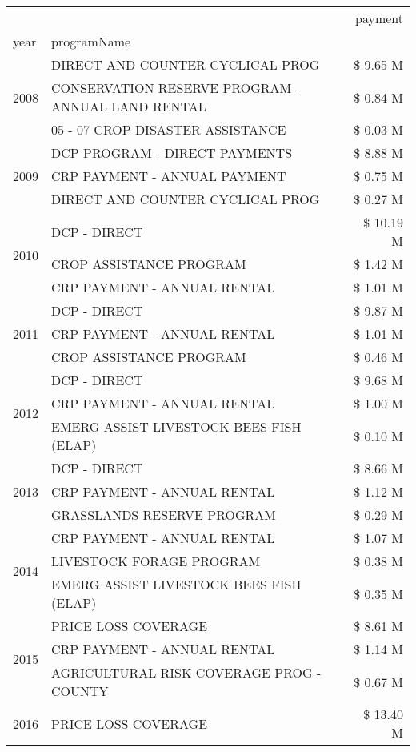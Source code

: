 \begin{tabular}{llr}
\toprule
 &  & payment \\
year & programName &  \\
\midrule
\multirow[t]{3}{*}{2008} & DIRECT AND COUNTER CYCLICAL PROG & \$ 9.65 M \\
 & CONSERVATION RESERVE PROGRAM - ANNUAL LAND RENTAL & \$ 0.84 M \\
 & 05 - 07 CROP DISASTER ASSISTANCE & \$ 0.03 M \\
\cline{1-3}
\multirow[t]{3}{*}{2009} & DCP PROGRAM - DIRECT PAYMENTS & \$ 8.88 M \\
 & CRP PAYMENT - ANNUAL PAYMENT & \$ 0.75 M \\
 & DIRECT AND COUNTER CYCLICAL PROG & \$ 0.27 M \\
\cline{1-3}
\multirow[t]{3}{*}{2010} & DCP - DIRECT & \$ 10.19 M \\
 & CROP ASSISTANCE PROGRAM & \$ 1.42 M \\
 & CRP PAYMENT - ANNUAL RENTAL & \$ 1.01 M \\
\cline{1-3}
\multirow[t]{3}{*}{2011} & DCP - DIRECT & \$ 9.87 M \\
 & CRP PAYMENT - ANNUAL RENTAL & \$ 1.01 M \\
 & CROP ASSISTANCE PROGRAM & \$ 0.46 M \\
\cline{1-3}
\multirow[t]{3}{*}{2012} & DCP - DIRECT & \$ 9.68 M \\
 & CRP PAYMENT - ANNUAL RENTAL & \$ 1.00 M \\
 & EMERG ASSIST LIVESTOCK BEES FISH (ELAP) & \$ 0.10 M \\
\cline{1-3}
\multirow[t]{3}{*}{2013} & DCP - DIRECT & \$ 8.66 M \\
 & CRP PAYMENT - ANNUAL RENTAL & \$ 1.12 M \\
 & GRASSLANDS RESERVE PROGRAM & \$ 0.29 M \\
\cline{1-3}
\multirow[t]{3}{*}{2014} & CRP PAYMENT - ANNUAL RENTAL & \$ 1.07 M \\
 & LIVESTOCK FORAGE PROGRAM & \$ 0.38 M \\
 & EMERG ASSIST LIVESTOCK BEES FISH (ELAP) & \$ 0.35 M \\
\cline{1-3}
\multirow[t]{3}{*}{2015} & PRICE LOSS COVERAGE & \$ 8.61 M \\
 & CRP PAYMENT - ANNUAL RENTAL & \$ 1.14 M \\
 & AGRICULTURAL RISK COVERAGE PROG - COUNTY & \$ 0.67 M \\
\cline{1-3}
\multirow[t]{3}{*}{2016} & PRICE LOSS COVERAGE & \$ 13.40 M \\

\end{tabular}
